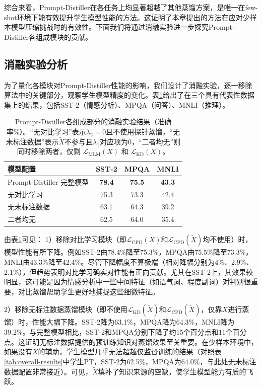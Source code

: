 \documentclass[../main.tex]{subfiles}
\begin{document}
综合来看，Prompt-Distiller在各任务上均显著超越了其他蒸馏方案，是唯一在few-shot环境下能有效提升学生模型性能的方法。这证明了本章提出的方法在应对少样本模型压缩挑战时的有效性。下面我们将通过消融实验进一步探究Prompt-Distiller各组成模块的贡献。

\subsection{消融实验分析}
\label{sec:3-5-3}
为了量化各模块对Prompt-Distiller性能的影响，我们设计了消融实验，逐一移除算法中的关键部分，观察学生模型精度的变化。表\ref{tab:ablation-results}给出了在三个具有代表性数据集上的结果，包括SST-2（情感分析）、MPQA（问答）、MNLI（推理）。

\begin{table}[htbp]
	\centering
	\caption{Prompt-Distiller各组成部分的消融实验结果（准确率\%）。“无对比学习”表示$\lambda_2=0$且不使用探针蒸馏，“无未标注数据”表示$\tilde{X}$不参与且$\lambda_1$对应项为0，“二者均无”则同时移除两者，仅剩 $\mathcal{L}_{\text{MLM}}(X)$ 和 $\mathcal{L}_{\text{KD}}(X)$。}
	\label{tab:ablation-results}
	\small\begin{tabular}{l|ccc}
		\toprule[1pt]
		\textbf{模型配置}         & \textbf{SST-2} & \textbf{MPQA} & \textbf{MNLI} \\
		\midrule[0.5pt]
		Prompt-Distiller 完整模型 & \textbf{78.4}  & \textbf{75.5} & \textbf{43.3} \\
		\midrule[0.5pt]
		无对比学习                 & 75.3           & 73.3          & 42.4          \\
		无未标注数据                & 63.1           & 64.3          & 39.2          \\
		二者均无                  & 62.5           & 64.0          & 35.4          \\
		\bottomrule[1pt]
	\end{tabular}
\end{table}

由表\ref{tab:ablation-results}可见：
1）移除对比学习模块（即$\mathcal{L}_{\text{CPD}}(X)$和$\mathcal{L}_{\text{CPD}}(\tilde{X})$均不使用）时，模型性能有所下降。例如SST-2由78.4\%降至75.3\%，MPQA由75.5\%降至73.3\%，MNLI由43.3\%降至42.4\%。尽管下降幅度不算极端（相对降幅分别为4\%、2.9\%、2.1\%），但趋势表明对比学习确实对性能有正向贡献。尤其在SST-2上，其效果较明显，这可能是因为情感分析中一些中间特征（如语气词、程度副词）对判别很重要，对比蒸馏帮助学生更好地捕捉这些细微特征。

2）移除无标注数据蒸馏模块（即不使用$\mathcal{L}_{\text{KD}}(\tilde{X})$和$\mathcal{L}_{\text{CPD}}(\tilde{X})$，仅靠$X$进行蒸馏）时，性能大幅下降。SST-2降为63.1\%，MPQA降为64.3\%，MNLI降为39.2\%。与完整模型相比，SST-2和MPQA分别下降了约15个百分点和11个百分点。这证明无标注数据提供的预训练知识对蒸馏效果至关重要。在少样本环境中，如果没有$\tilde{X}$的辅助，学生模型几乎无法超越仅监督训练的结果（对照表\ref{tab:overall-results}中学生PT，SST-2为62.5\%，MPQA为64.0\%，与此处无未标注数据配置非常接近）。可见，$\tilde{X}$填补了知识来源的空缺，使学生模型能力有质的飞跃。
\end{document}
